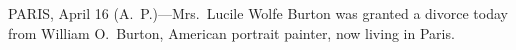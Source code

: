 
PARIS, April 16 (A.~P.)---Mrs.~Lucile Wolfe Burton was granted a
divorce today from William O.\ Burton, American portrait painter, now
living in Paris.
